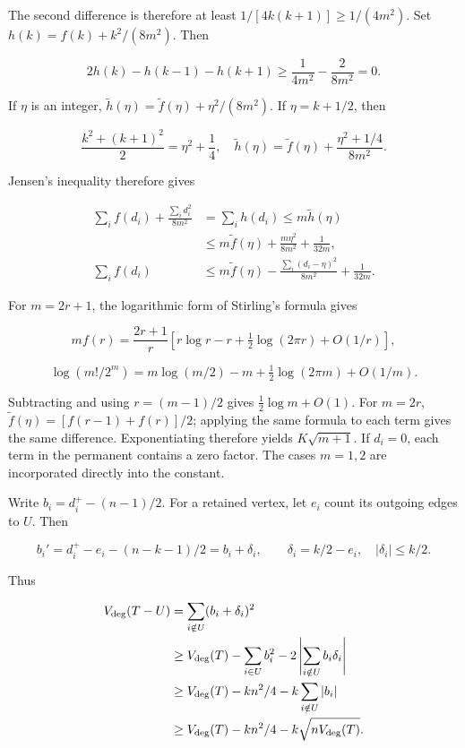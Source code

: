 \documentclass[11pt,a4paper]{article}
\begin{document}
The second difference is therefore at least \(1/[4k(k+1)]\ge1/(4m^2)\). Set \(h(k)=f(k)+k^2/(8m^2)\). Then

\[
2h(k)-h(k-1)-h(k+1)
\ge\frac1{4m^2}-\frac2{8m^2}=0.
\]

If \(\eta\) is an integer, \(\widetilde h(\eta)=\widetilde f(\eta)+\eta^2/(8m^2)\). If \(\eta=k+1/2\), then

\[
\frac{k^2+(k+1)^2}{2}=\eta^2+\frac14,
\quad
\widetilde h(\eta)=\widetilde f(\eta)+\frac{\eta^2+1/4}{8m^2}.
\]

Jensen's inequality therefore gives

\[
\begin{aligned}
\sum_i f(d_i)+\frac{\sum_i d_i^2}{8m^2}
&=\sum_i h(d_i)\le m\widetilde h(\eta)\\
&\le m\widetilde f(\eta)+\frac{m\eta^2}{8m^2}+\frac1{32m},\\
\sum_i f(d_i)&\le m\widetilde f(\eta)
-\frac{\sum_i(d_i-\eta)^2}{8m^2}+\frac1{32m}.
\end{aligned}
\]

For \(m=2r+1\), the logarithmic form of Stirling's formula gives

\[
m f(r)=\frac{2r+1}{r}\left[r\log r-r+\tfrac12\log(2\pi r)+O(1/r)\right],
\]

\[
\log(m!/2^m)=m\log(m/2)-m+\tfrac12\log(2\pi m)+O(1/m).
\]

Subtracting and using \(r=(m-1)/2\) gives \(\tfrac12\log m+O(1)\). For \(m=2r\), \(\widetilde f(\eta)=[f(r-1)+f(r)]/2\); applying the same formula to each term gives the same difference. Exponentiating therefore yields \(K\sqrt{m+1}\). If \(d_i=0\), each term in the permanent contains a zero factor. The cases \(m=1,2\) are incorporated directly into the constant.

Write \(b_i=d_i^+-(n-1)/2\). For a retained vertex, let \(e_i\) count its outgoing edges to \(U\). Then

\[
b_i'=d_i^+-e_i-(n-k-1)/2=b_i+\delta_i,
\qquad\delta_i=k/2-e_i,\quad |\delta_i|\le k/2.
\]

Thus

\[
\begin{aligned}
V_{\rm deg}(T-U)&=\sum_{i\notin U}(b_i+\delta_i)^2\\
&\ge V_{\rm deg}(T)-\sum_{i\in U}b_i^2-2\left|\sum_{i\notin U}b_i\delta_i\right|\\
&\ge V_{\rm deg}(T)-kn^2/4-k\sum_{i\notin U}|b_i|\\
&\ge V_{\rm deg}(T)-kn^2/4-k\sqrt{nV_{\rm deg}(T)}.
\end{aligned}
\]
\end{document}
